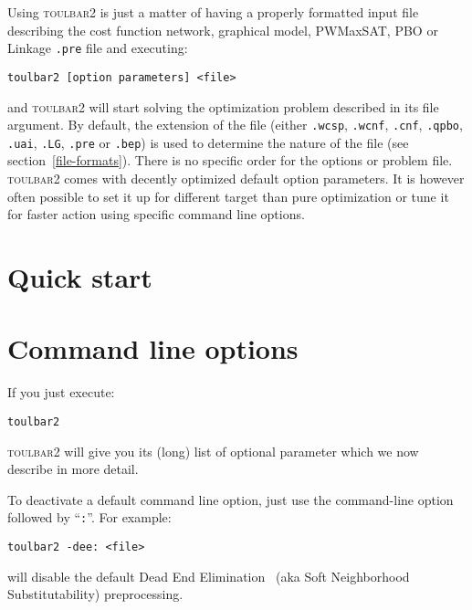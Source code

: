 \documentclass{article}
\def\toulbar2{\textsc{toulbar2}}
\begin{document}
Using \toulbar2 is just a matter of having a properly formatted input
file describing the cost function network, graphical model, PWMaxSAT,
PBO or Linkage \texttt{.pre} file and executing:

\begin{verbatim}
toulbar2 [option parameters] <file>
\end{verbatim}

and \toulbar2 will start solving the optimization problem described in
its file argument. By default, the extension of the file (either
\texttt{.wcsp}, \texttt{.wcnf}, \texttt{.cnf}, \texttt{.qpbo},
\texttt{.uai}, \texttt{.LG}, \texttt{.pre} or \texttt{.bep}) is used
to determine the nature of the file (see
section~\ref{file-formats}). There is no specific order for the
options or problem file. \toulbar2 comes with decently optimized
default option parameters. It is however often possible to set it up
for different target than pure optimization or tune it for faster
action using specific command line options.

\section{Quick start}
\label{quickstart}



\section{Command line options}

If you just execute:

\begin{verbatim}
toulbar2
\end{verbatim}

\toulbar2 will give you its (long) list of optional parameter which we
now describe in more detail. 


To deactivate a default command line option, just use the
command-line option followed by ``\texttt{:}''. For example:

\begin{verbatim}
toulbar2 -dee: <file>
\end{verbatim}

will disable the default Dead End Elimination~\cite{Givry13a} (aka Soft Neighborhood
Substitutability) preprocessing.
\end{document}
